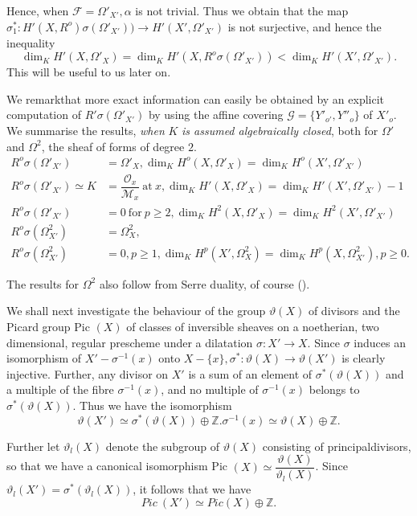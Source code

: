 Hence, when $\mathscr{F}= \Omega'_{X'}, \alpha$ is not
trivial. Thus we obtain that the map $\sigma^*_1 : H'(X, R^o) \sigma
(\Omega'_{X'})) \to H' (X' , \Omega'_{X'})$ is not surjective,
and hence the inequality 
$$
\dim_K H'(X, \Omega'_{X}) = \dim_K H'(X, R^o \sigma
(\Omega'_{X'})) < \dim_K H'(X' , \Omega'_{X'}). 
$$
This will be useful to us later on.

We remark\pageoriginale that more exact information can easily be
obtained by an 
explicit computation of $R' \sigma (\Omega'_{X'})$ by using the
affine covering $\mathscr{G} = \{ Y'_{o'} , Y''_o \}$ of
$X'_o$. We summarise the results, \textit{ when } $K$ \textit{is
  assumed algebraically closed}, both for $\Omega'$ and $\Omega^2$,
the sheaf of forms of degree $2$. 
\begin{align*}
  R^o \sigma (\Omega'_{X'}) &= \Omega'_{X}, \dim_K H^o (X,
  \Omega'_{X}) = \dim_K H^o(X', \Omega'_{X'})\\
  R^o \sigma (\Omega'_{X'}) \simeq K & =
  \dfrac{\mathscr{O}_x}{\mathcal{M}_x} ~\text{at}~ x, \dim_K H'(X,
  \Omega'_{X}) = \dim_K H'(X', \Omega'_{X'}) -1 \\
  R^o \sigma (\Omega'_{X'}) & = 0 ~\text{for}~ p \geq 2, \dim_K
  H^{2}(X, \Omega'_{X}) = \dim_K H^{2}(X', \Omega'_{X'})\\  
  R^o \sigma (\Omega^{2}_{X'}) & = \Omega^{2}_{X},\\
  R^o \sigma (\Omega^{2}_{X'}) &= 0, p \geq 1, \dim_K H^{p}(X',
  \Omega^{2}_{X}) = \dim_K H^{p}(X, \Omega^{2}_{X'}), p \geq 0. 
\end{align*}

The results for $\Omega^{2}$ also follow from Serre duality, of course
(\cite{key27}).

We shall next investigate the behaviour of the group $\vartheta(X)$
of divisors and the Picard group Pic $(X)$ of classes of inversible
sheaves on a noetherian, two dimensional, regular prescheme under a
dilatation $\sigma : X' \to X$. Since $\sigma$ induces an isomorphism
of $X' - \sigma^{-1}(x)$ onto $X- \{x\}, \sigma^* : \vartheta (X) \to
\vartheta (X')$ is clearly injective. Further, any divisor on $X'$ is
a sum of an element of $\sigma^* (\vartheta(X))$ and a multiple of the
fibre $\sigma^{-1}(x)$, and no multiple of $\sigma^{-1}(x)$ belongs to
$\sigma^* (\vartheta(X))$. Thus we have the isomorphism 
$$
\vartheta(X') \simeq \sigma^{*} (\vartheta(X)) \oplus
\mathbb{Z}. \sigma^{-1}(x) \simeq \vartheta(X) \oplus \mathbb{Z}. 
$$

Further let $\vartheta_l(X)$ denote the subgroup of $\vartheta(X)$
consisting of principal\pageoriginale divisors, so that we have a canonical
isomorphism Pic $(X) \simeq
\dfrac{\vartheta(X)}{\vartheta_l(X)}$. Since $\vartheta_l (X') =
\sigma^* (\vartheta_l (X))$, it follows that we have 
$$
Pic ~ (X') \simeq Pic (X) \oplus \mathbb{Z}.
$$

